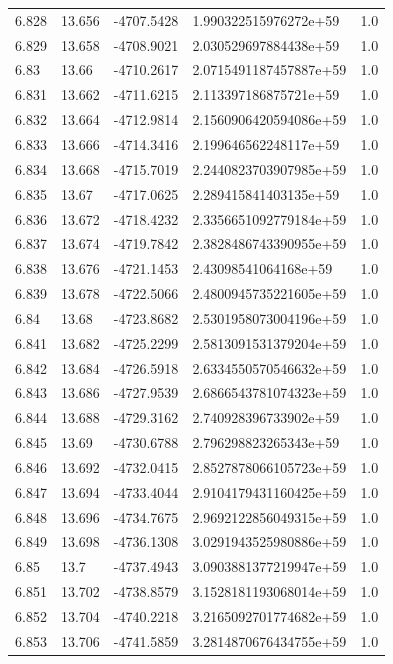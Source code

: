 \begin{tabular}{lllll}
6.828 & 13.656 & -4707.5428 & 1.990322515976272e+59 & 1.0 \\
6.829 & 13.658 & -4708.9021 & 2.030529697884438e+59 & 1.0 \\
6.83 & 13.66 & -4710.2617 & 2.0715491187457887e+59 & 1.0 \\
6.831 & 13.662 & -4711.6215 & 2.113397186875721e+59 & 1.0 \\
6.832 & 13.664 & -4712.9814 & 2.1560906420594086e+59 & 1.0 \\
6.833 & 13.666 & -4714.3416 & 2.199646562248117e+59 & 1.0 \\
6.834 & 13.668 & -4715.7019 & 2.2440823703907985e+59 & 1.0 \\
6.835 & 13.67 & -4717.0625 & 2.289415841403135e+59 & 1.0 \\
6.836 & 13.672 & -4718.4232 & 2.3356651092779184e+59 & 1.0 \\
6.837 & 13.674 & -4719.7842 & 2.3828486743390955e+59 & 1.0 \\
6.838 & 13.676 & -4721.1453 & 2.43098541064168e+59 & 1.0 \\
6.839 & 13.678 & -4722.5066 & 2.4800945735221605e+59 & 1.0 \\
6.84 & 13.68 & -4723.8682 & 2.5301958073004196e+59 & 1.0 \\
6.841 & 13.682 & -4725.2299 & 2.5813091531379204e+59 & 1.0 \\
6.842 & 13.684 & -4726.5918 & 2.6334550570546632e+59 & 1.0 \\
6.843 & 13.686 & -4727.9539 & 2.6866543781074323e+59 & 1.0 \\
6.844 & 13.688 & -4729.3162 & 2.740928396733902e+59 & 1.0 \\
6.845 & 13.69 & -4730.6788 & 2.796298823265343e+59 & 1.0 \\
6.846 & 13.692 & -4732.0415 & 2.8527878066105723e+59 & 1.0 \\
6.847 & 13.694 & -4733.4044 & 2.9104179431160425e+59 & 1.0 \\
6.848 & 13.696 & -4734.7675 & 2.9692122856049315e+59 & 1.0 \\
6.849 & 13.698 & -4736.1308 & 3.0291943525980886e+59 & 1.0 \\
6.85 & 13.7 & -4737.4943 & 3.0903881377219947e+59 & 1.0 \\
6.851 & 13.702 & -4738.8579 & 3.1528181193068014e+59 & 1.0 \\
6.852 & 13.704 & -4740.2218 & 3.2165092701774682e+59 & 1.0 \\
6.853 & 13.706 & -4741.5859 & 3.2814870676434755e+59 & 1.0 \\

\end{tabular}
